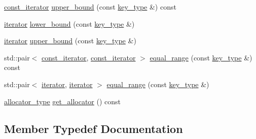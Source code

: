 \begin{DoxyCompactItemize}
\item 
\hyperlink{classnifty_1_1container_1_1FlatSet_a0f4cd26da060859b18742abfd534aa24}{const\+\_\+iterator} \hyperlink{classnifty_1_1container_1_1FlatSet_a0ac07324feb622244c7f91bcf153af87}{upper\+\_\+bound} (const \hyperlink{classnifty_1_1container_1_1FlatSet_a0101a4574052389646be8d9bf092a949}{key\+\_\+type} \&) const
\item 
\hyperlink{classnifty_1_1container_1_1FlatSet_a9c7fd20cd6b1878ccb8a7e068072c795}{iterator} \hyperlink{classnifty_1_1container_1_1FlatSet_a824de5a2d87a1d938af264a8e06c4a2a}{lower\+\_\+bound} (const \hyperlink{classnifty_1_1container_1_1FlatSet_a0101a4574052389646be8d9bf092a949}{key\+\_\+type} \&)
\item 
\hyperlink{classnifty_1_1container_1_1FlatSet_a9c7fd20cd6b1878ccb8a7e068072c795}{iterator} \hyperlink{classnifty_1_1container_1_1FlatSet_ad29a9db87f15925db9d5569482720b5b}{upper\+\_\+bound} (const \hyperlink{classnifty_1_1container_1_1FlatSet_a0101a4574052389646be8d9bf092a949}{key\+\_\+type} \&)
\item 
std\+::pair$<$ \hyperlink{classnifty_1_1container_1_1FlatSet_a0f4cd26da060859b18742abfd534aa24}{const\+\_\+iterator}, \hyperlink{classnifty_1_1container_1_1FlatSet_a0f4cd26da060859b18742abfd534aa24}{const\+\_\+iterator} $>$ \hyperlink{classnifty_1_1container_1_1FlatSet_a1ab96837744fc952be75365c00c815e0}{equal\+\_\+range} (const \hyperlink{classnifty_1_1container_1_1FlatSet_a0101a4574052389646be8d9bf092a949}{key\+\_\+type} \&) const
\item 
std\+::pair$<$ \hyperlink{classnifty_1_1container_1_1FlatSet_a9c7fd20cd6b1878ccb8a7e068072c795}{iterator}, \hyperlink{classnifty_1_1container_1_1FlatSet_a9c7fd20cd6b1878ccb8a7e068072c795}{iterator} $>$ \hyperlink{classnifty_1_1container_1_1FlatSet_a777b777d0e79a499a72661e62fabc903}{equal\+\_\+range} (const \hyperlink{classnifty_1_1container_1_1FlatSet_a0101a4574052389646be8d9bf092a949}{key\+\_\+type} \&)
\item 
\hyperlink{classnifty_1_1container_1_1FlatSet_aafc00d7d957c81f01ee8cd5dcabb4c78}{allocator\+\_\+type} \hyperlink{classnifty_1_1container_1_1FlatSet_a1e302c2990cee7d044e0793fdb0dcf7f}{get\+\_\+allocator} () const
\end{DoxyCompactItemize}


\subsection{Member Typedef Documentation}
\mbox{\label{classnifty_1_1container_1_1FlatSet_aafc00d7d957c81f01ee8cd5dcabb4c78}} 

